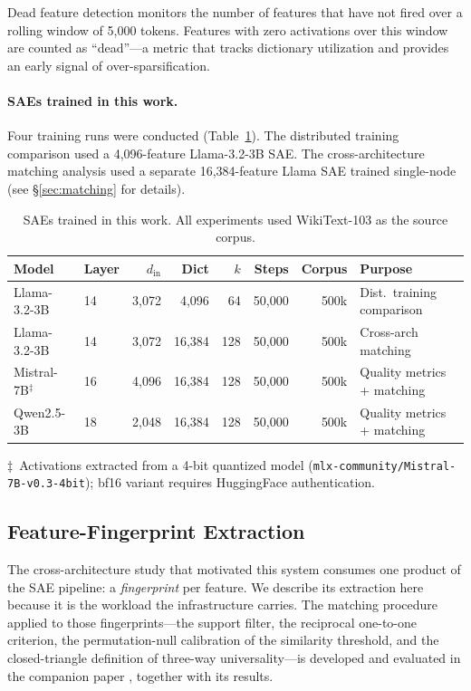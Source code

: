 \documentclass[11pt]{article}
\begin{document}
Dead feature detection monitors the number of features that have not fired over a rolling window of 5,000 tokens. Features with zero activations over this window are counted as ``dead''---a metric that tracks dictionary utilization and provides an early signal of over-sparsification.

\paragraph{SAEs trained in this work.} Four training runs were conducted (Table~\ref{tab:training}). The distributed training comparison used a 4,096-feature Llama-3.2-3B SAE. The cross-architecture matching analysis used a separate 16,384-feature Llama SAE trained single-node (see \S\ref{sec:matching} for details).

\begin{table}[h]
\centering
\caption{SAEs trained in this work. All experiments used WikiText-103 as the source corpus.}
\label{tab:training}
  \small\setlength{\tabcolsep}{4pt}
\begin{tabular}{@{}llrrrrrl@{}}
\toprule
Model & Layer & $d_{\mathrm{in}}$ & Dict & $k$ & Steps & Corpus & Purpose \\
\midrule
Llama-3.2-3B & 14 & 3,072 & 4,096 & 64 & 50,000 & 500k & Dist.\ training comparison \\
Llama-3.2-3B & 14 & 3,072 & 16,384 & 128 & 50,000 & 500k & Cross-arch matching \\
Mistral-7B$^\ddagger$ & 16 & 4,096 & 16,384 & 128 & 50,000 & 500k & Quality metrics + matching \\
Qwen2.5-3B & 18 & 2,048 & 16,384 & 128 & 50,000 & 500k & Quality metrics + matching \\
\bottomrule
\end{tabular}

\smallskip
\noindent\footnotesize

$\ddagger$~Activations extracted from a 4-bit quantized model (\texttt{mlx-community/Mistral-7B-v0.3-4bit}); bf16 variant requires HuggingFace authentication.
\end{table}

\subsection{Feature-Fingerprint Extraction}
\label{sec:matching-method}

The cross-architecture study that motivated this system consumes one product of the SAE pipeline: a \emph{fingerprint} per feature. We describe its extraction here because it is the workload the infrastructure carries. The matching procedure applied to those fingerprints---the support filter, the reciprocal one-to-one criterion, the permutation-null calibration of the similarity threshold, and the closed-triangle definition of three-way universality---is developed and evaluated in the companion paper \citep{melton2026saecomparison}, together with its results.
\end{document}
